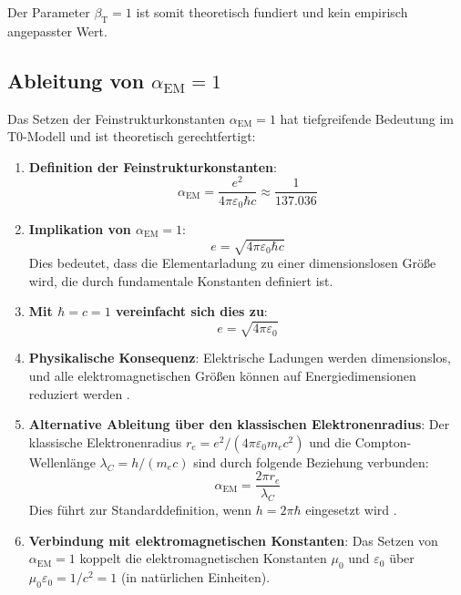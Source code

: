 \documentclass[12pt,a4paper]{article}
\newcommand{\alphaEM}{\alpha_{\text{EM}}}
\newcommand{\betaT}{\beta_{\text{T}}}
\begin{document}
	Der Parameter $\betaT = 1$ ist somit theoretisch fundiert und kein empirisch angepasster Wert.
	
	\subsection{Ableitung von $\alphaEM = 1$}
	
	Das Setzen der Feinstrukturkonstanten $\alphaEM = 1$ hat tiefgreifende Bedeutung im T0-Modell und ist theoretisch gerechtfertigt:
	
	\begin{enumerate}
		\item \textbf{Definition der Feinstrukturkonstanten}:
		\begin{equation}
			\alphaEM = \frac{e^2}{4\pi\varepsilon_0\hbar c} \approx \frac{1}{137.036}
		\end{equation}
		
		\item \textbf{Implikation von $\alphaEM = 1$}:
		\begin{equation}
			e = \sqrt{4\pi\varepsilon_0\hbar c}
		\end{equation}
		Dies bedeutet, dass die Elementarladung zu einer dimensionslosen Größe wird, die durch fundamentale Konstanten definiert ist.
		
		\item \textbf{Mit $\hbar = c = 1$ vereinfacht sich dies zu}:
		\begin{equation}
			e = \sqrt{4\pi\varepsilon_0}
		\end{equation}
		
		\item \textbf{Physikalische Konsequenz}:
		Elektrische Ladungen werden dimensionslos, und alle elektromagnetischen Größen können auf Energiedimensionen reduziert werden \cite{pascher_alpha_2025}.
		
		\item \textbf{Alternative Ableitung über den klassischen Elektronenradius}:
		Der klassische Elektronenradius $r_e = e^2/(4\pi\varepsilon_0m_e c^2)$ und die Compton-Wellenlänge $\lambda_C = h/(m_e c)$ sind durch folgende Beziehung verbunden:
		\begin{equation}
			\alphaEM = \frac{2\pi r_e}{\lambda_C}
		\end{equation}
		Dies führt zur Standarddefinition, wenn $h = 2\pi\hbar$ eingesetzt wird \cite{pascher_alpha_2025}.
		
		\item \textbf{Verbindung mit elektromagnetischen Konstanten}:
		Das Setzen von $\alphaEM = 1$ koppelt die elektromagnetischen Konstanten $\mu_0$ und $\varepsilon_0$ über $\mu_0\varepsilon_0 = 1/c^2 = 1$ (in natürlichen Einheiten).
	\end{enumerate}
	
\end{document}
